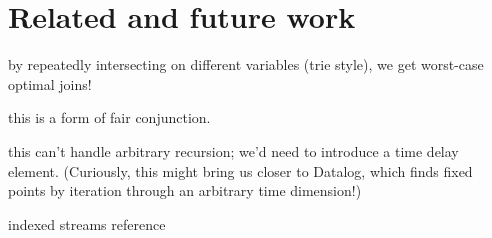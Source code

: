 \documentclass[acmsmall,screen,review,anonymous,dvipsnames,svgnames]{acmart}
\newcommand\todo[1]{{\color{Orange}#1}}
\renewcommand\todo[1]{{\color{IndianRed}#1}}
\begin{document}



\section{Related and future work}

\todo{by repeatedly intersecting on different variables (trie style), we get worst-case optimal joins!}

\todo{this is a form of fair conjunction.}

\todo{this can't handle arbitrary recursion; we'd need to introduce a time delay element. (Curiously, this might bring us closer to Datalog, which finds fixed points by iteration through an arbitrary time dimension!)}

\todo{indexed streams reference}



\end{document}
